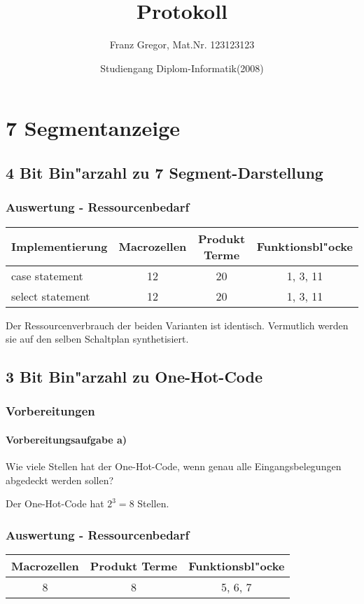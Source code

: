 \documentclass [] {scrartcl}
\begin{document}
  \subject{Praktikums Programmierbare Schaltkreise}
  \title{Protokoll}
  \author{Franz Gregor, Mat.Nr. 123123123 \and Studiengang Diplom-Informatik(2008)}

  \maketitle

  \section{7 Segmentanzeige}
  \subsection{4 Bit Bin"arzahl zu 7 Segment-Darstellung}
  \subsubsection{Auswertung - Ressourcenbedarf}
  \begin{table}[h]
    \begin{tabular}{l|c|c|c}
      Implementierung & Macrozellen & Produkt Terme & Funktionsbl"ocke\\
      \hline
      case statement & 12 & 20 & 1, 3, 11\\
      select statement & 12 & 20 & 1, 3, 11\\
    \end{tabular}
    Der Ressourcenverbrauch der beiden Varianten ist identisch. Vermutlich werden sie auf den selben Schaltplan synthetisiert.
  \end{table}
  \subsection{3 Bit Bin"arzahl zu One-Hot-Code}
  \subsubsection{Vorbereitungen}
  \paragraph{Vorbereitungsaufgabe a)}
  Wie viele Stellen hat der One-Hot-Code, wenn genau alle Eingangsbelegungen abgedeckt werden sollen?

  Der One-Hot-Code hat $2^3 = 8$ Stellen.
  \subsubsection{Auswertung - Ressourcenbedarf}
  \begin{table}[h]
    \begin{tabular}{c|c|c}
      Macrozellen & Produkt Terme & Funktionsbl"ocke\\
      \hline
      8 & 8 & 5, 6, 7\\
    \end{tabular}
  \end{table}
\end{document}
